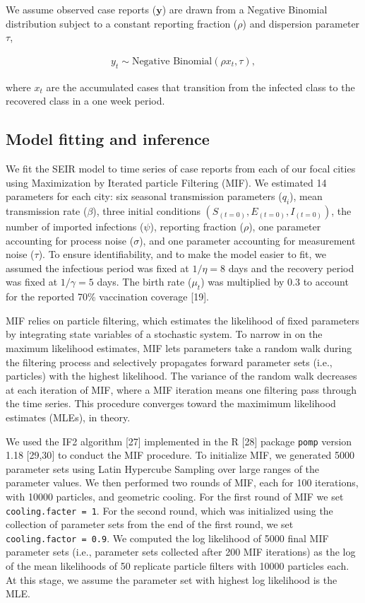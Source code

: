 \documentclass[3p]{elsarticle} %
\begin{document}
We assume observed case reports (\(\textbf{y}\)) are drawn from a
Negative Binomial distribution subject to a constant reporting fraction
(\(\rho\)) and dispersion parameter \(\tau\),

\begin{align}
y_t \sim \text{Negative Binomial} \left( \rho x_t, \tau \right),
\end{align}

\noindent{}where \(x_t\) are the accumulated cases that transition from
the infected class to the recovered class in a one week period.

\hypertarget{model-fitting-and-inference}{%
\subsection{Model fitting and
inference}\label{model-fitting-and-inference}}

We fit the SEIR model to time series of case reports from each of our
focal cities using Maximization by Iterated particle Filtering (MIF). We
estimated 14 parameters for each city: six seasonal transmission
parameters (\(q_i\)), mean transmission rate (\(\beta\)), three initial
conditions \(\left(S_{(t=0)},E_{(t=0)},I_{(t=0)}\right)\), the number of
imported infections (\(\psi\)), reporting fraction (\(\rho\)), one
parameter accounting for process noise (\(\sigma\)), and one parameter
accounting for measurement noise (\(\tau\)). To ensure identifiability,
and to make the model easier to fit, we assumed the infectious period
was fixed at \(1/\eta = 8\) days and the recovery period was fixed at
\(1/\gamma = 5\) days. The birth rate (\(\mu_t\)) was multiplied by 0.3
to account for the reported 70\% vaccination coverage {[}19{]}.

MIF relies on particle filtering, which estimates the likelihood of
fixed parameters by integrating state variables of a stochastic system.
To narrow in on the maximum likelihood estimates, MIF lets parameters
take a random walk during the filtering process and selectively
propagates forward parameter sets (i.e., particles) with the highest
likelihood. The variance of the random walk decreases at each iteration
of MIF, where a MIF iteration means one filtering pass through the time
series. This procedure converges toward the maximimum likelihood
estimates (MLEs), in theory.

We used the IF2 algorithm {[}27{]} implemented in the R {[}28{]} package
\texttt{pomp} version 1.18 {[}29,30{]} to conduct the MIF procedure. To
initialize MIF, we generated 5000 parameter sets using Latin Hypercube
Sampling over large ranges of the parameter values. We then performed
two rounds of MIF, each for 100 iterations, with 10000 particles, and
geometric cooling. For the first round of MIF we set
\texttt{cooling.facter\ =\ 1}. For the second round, which was
initialized using the collection of parameter sets from the end of the
first round, we set \texttt{cooling.factor\ =\ 0.9}. We computed the log
likelihood of 5000 final MIF parameter sets (i.e., parameter sets
collected after 200 MIF iterations) as the log of the mean likelihoods
of 50 replicate particle filters with 10000 particles each. At this
stage, we assume the parameter set with highest log likelihood is the
MLE.
\end{document}
